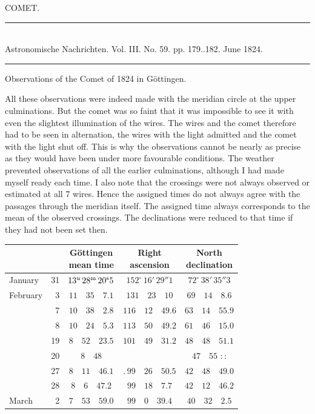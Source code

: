 \clearpage
{}
\hypertarget{native-455-comet}{}
\begin{center}
{\large COMET.}
\end{center}

\begin{center}
\rule{6cm}{0.4pt}\\
Astronomische Nachrichten. Vol. III. No. 59. pp. 179..182. June 1824.\\
\rule{6cm}{0.4pt}
\end{center}

\begin{center}
Observations of the Comet of 1824 in Göttingen.
\end{center}

All these observations were indeed made with the meridian circle at the upper culminations. But the comet was so faint that it was impossible to see it with even the slightest illumination of the wires. The wires and the comet therefore had to be seen in alternation, the wires with the light admitted and the comet with the light shut off. This is why the observations cannot be nearly as precise as they would have been under more favourable conditions. The weather prevented observations of all the earlier culminations, although I had made myself ready each time. I also note that the crossings were not always observed or estimated at all 7 wires. Hence the assigned times do not always agree with the passages through the meridian itself. The assigned time always corresponds to the mean of the observed crossings. The declinations were reduced to that time if they had not been set then.

\begin{center}
\begingroup\small\setlength{\tabcolsep}{4pt}
\begin{tabular}{lr|c|c|c}
\multicolumn{2}{c|}{} & \shortstack{Göttingen\\mean time} & \shortstack{Right\\ascension} & \shortstack{North\\declination} \\
\hline
January & 31 & $13^{\rm u}\,28^{\rm m}\,20^{\rm s}5$ & $152^{\circ}\,16'\,29''1$ & $72^{\circ}\,38'\,35''3$ \\
February & 3 & $11\quad35\quad7.1$ & $131\quad23\quad10$ & $69\quad14\quad8.6$ \\
 & 7 & $10\quad38\quad2.8$ & $116\quad12\quad49.6$ & $63\quad14\quad55.9$ \\
 & 8 & $10\quad24\quad5.3$ & $113\quad50\quad49.2$ & $61\quad46\quad15.0$ \\
 & 19 & $8\quad52\quad23.5$ & $101\quad49\quad31.2$ & $48\quad48\quad51.1$ \\
 & 20 & $8\quad48$ &  & $47\quad55$ \quad :\,: \\
 & 27 & $8\quad11\quad46.1$ & .\,$99\quad26\quad50.5$ & $42\quad48\quad49.0$ \\
 & 28 & $8\quad6\quad47.2$ & $99\quad18\quad7.7$ & $42\quad12\quad46.2$ \\
March & 2 & $7\quad53\quad59.0$ & $99\quad0\quad39.4$ & $40\quad32\quad2.5$ \\
\end{tabular}
\endgroup
\end{center}

